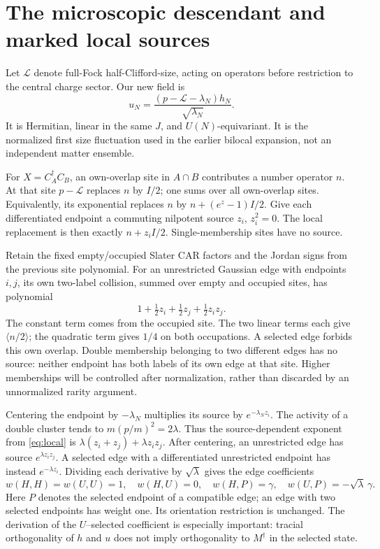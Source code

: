 \documentclass[11pt]{article}
\begin{document}
\newpage
\section{The microscopic descendant and marked local sources}
Let $\mathcal L$ denote full-Fock half-Clifford-size, acting on operators
before restriction to the central charge sector. Our new field is
\begin{equation}\label{eq:u}
 u_N=\frac{(p-\mathcal L-\lambda_N)h_N}{\sqrt{\lambda_N}}.
\end{equation}
It is Hermitian, linear in the same $J$, and $U(N)$-equivariant. It is the
normalized first size fluctuation used in the earlier bilocal expansion,
not an independent matter ensemble.

For $X=C_A^\dagger C_B$, an own-overlap site in $A\cap B$ contributes a
number operator $n$. At that site $p-\mathcal L$ replaces $n$ by $I/2$;
one sums over all own-overlap sites. Equivalently, its exponential
replaces $n$ by $n+(e^z-1)I/2$. Give each differentiated endpoint a
commuting nilpotent source $z_i$, $z_i^2=0$. The local replacement is
then exactly $n+z_iI/2$. Single-membership sites have no source.

Retain the fixed empty/occupied Slater CAR factors and the Jordan signs
from the previous site polynomial. For an unrestricted Gaussian edge
with endpoints $i,j$, its own two-label collision, summed over empty and
occupied sites, has polynomial
\begin{equation}\label{eq:local}
 1+\tfrac12 z_i+\tfrac12 z_j+\tfrac12 z_i z_j.
\end{equation}
The constant term comes from the occupied site. The two linear terms
each give $\langle n/2\rangle$; the quadratic term gives $1/4$ on both
occupations. A selected edge forbids this own overlap. Double membership
belonging to two different edges has no source: neither endpoint has
both labels of its own edge at that site. Higher memberships will be
controlled after normalization, rather than discarded by an
unnormalized rarity argument.

Centering the endpoint by $-\lambda_N$ multiplies its source by
$e^{-\lambda_N z_i}$. The activity of a double cluster tends to
$m(p/m)^2=2\lambda$. Thus the source-dependent exponent from
\eqref{eq:local} is
$\lambda(z_i+z_j)+\lambda z_i z_j$. After centering, an unrestricted
edge has source $e^{\lambda z_i z_j}$. A selected edge with a
differentiated unrestricted endpoint has instead $e^{-\lambda z_i}$.
Dividing each derivative by $\sqrt\lambda$ gives the edge coefficients
\begin{equation}\label{eq:coeff}
 w(H,H)=w(U,U)=1,\quad w(H,U)=0,\quad
 w(H,P)=\gamma,\quad w(U,P)=-\sqrt\lambda\,\gamma.
\end{equation}
Here $P$ denotes the selected endpoint of a compatible edge; an edge
with two selected endpoints has weight one. Its orientation restriction
is unchanged. The derivation of the $U$--selected coefficient is
especially important: tracial orthogonality of $h$ and $u$ does not
imply orthogonality to $M^\dagger$ in the selected state.
\end{document}
